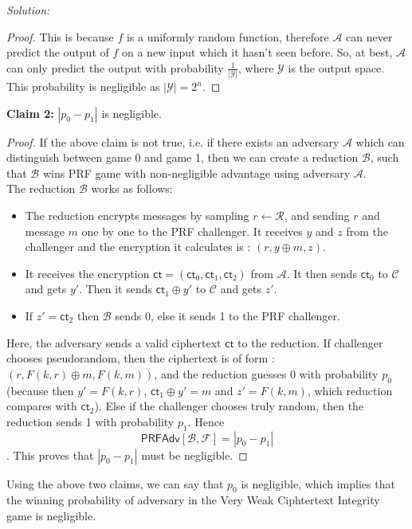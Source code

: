 \documentclass[a4paper, 11pt]{article}
\newenvironment{solution}
    {\textit{Solution:}}
    {\clearpage}
\newcommand{\ct}{\mathsf{ct}}
\newcommand{\prf}{\mathsf{PRFAdv}}
\newcommand{\calA}{\mathcal{A}}
\newcommand{\calB}{\mathcal{B}}
\newcommand{\calC}{\mathcal{C}}
\newcommand{\calF}{\mathcal{F}}
\newcommand{\calY}{\mathcal{Y}}
\newcommand{\calR}{\mathcal{R}}
\begin{document}
\begin{solution}
    \begin{proof} This is because $f$ is a uniformly random function, therefore $\calA$ can never predict the output of $f$ on a new input which it hasn't seen before. So, at best, $\calA$ can only predict the output with probability $\frac{1}{|\calY|}$, where $\calY$ is the output space. This probability is negligible as $|\calY| = 2^n$.
    \end{proof}
    \textbf{Claim 2: } $|p_0 - p_1|$ is negligible.
    \begin{proof} If the above claim is not true, i.e. if there exists an adversary $\calA$ which can distinguish between game 0 and game 1, then we can create a reduction $\calB$, such that $\calB$ wins PRF game with non-negligible advantage using adversary $\calA$. \\
        The reduction $\calB$ works as follows:
        \begin{itemize}
            \item The reduction encrypts messages by sampling $r \leftarrow \calR$, and sending $r$ and message $m$ one by one to the PRF challenger. It receives $y$ and $z$ from the challenger and the encryption it calculates is : $(r, y \oplus m, z)$.
            \item It receives the encryption $\ct = (\ct_0, \ct_1, \ct_2)$ from $\calA$. It then sends $\ct_0$ to $\calC$ and gets $y'$. Then it sends $\ct_1 \oplus y'$ to $\calC$ and gets $z'$.
            \item  If $z' = \ct_2$ then $\calB$ sends 0, else it sends 1 to the PRF challenger.
        \end{itemize}
        Here, the adversary sends a valid ciphertext $\ct$ to the reduction. If challenger chooses pseudorandom, then the ciphertext is of form : $(r, F(k, r) \oplus m, F(k, m))$, and the reduction guesses 0 with probability $p_0$ (because then $y' = F(k, r)$, $\ct_1 \oplus y' = m$ and $z' = F(k, m)$, which reduction compares with $\ct_2$). Else if the challenger chooses truly random, then the reduction sends 1 with probability $p_1$. Hence $$ \prf[\calB, \calF] = | p_0 - p_1 | $$. This proves that $| p_0 - p_1 |$ must be negligible.
    \end{proof}
        Using the above two claims, we can say that $p_0$ is negligible, which implies that the winning probability of adversary in the Very Weak Ciphtertext Integrity game is negligible.
    
\end{solution}
\end{document}
